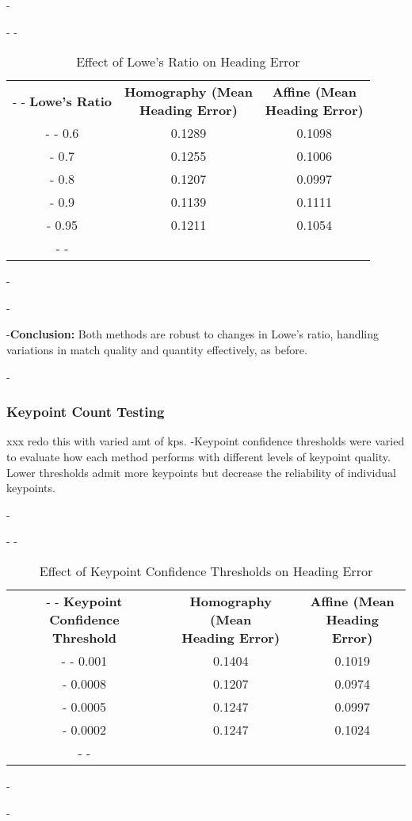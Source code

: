 -\begin{table}[H]
-    \centering
-    \begin{tabular}{|c|c|c|}
-        \hline
-        \textbf{Lowe's Ratio} & \makecell{\textbf{Homography (Mean} \\ \textbf{Heading Error)}} & \makecell{\textbf{Affine (Mean} \\ \textbf{Heading Error)}} \\
-        \hline
-        0.6 & 0.1289 & 0.1098 \\
-        0.7 & 0.1255 & 0.1006 \\
-        0.8 & 0.1207 & 0.0997 \\
-        0.9 & 0.1139 & 0.1111 \\
-        0.95 & 0.1211 & 0.1054 \\
-        \hline
-    \end{tabular}
-    \caption{Effect of Lowe's Ratio on Heading Error}
-\end{table}

-\textbf{Conclusion:} Both methods are robust to changes in Lowe’s ratio, handling variations in match quality and quantity effectively, as before.

-\subsubsection{Keypoint Count Testing} xxx redo this with varied amt of kps.
-Keypoint confidence thresholds were varied to evaluate how each method performs with different levels of keypoint quality. Lower thresholds admit more keypoints but decrease the reliability of individual keypoints.

-\begin{table}[H]
-    \centering
-    \begin{tabular}{|c|c|c|}
-        \hline
-        \makecell{\textbf{Keypoint Confidence} \\ \textbf{Threshold}} & \makecell{\textbf{Homography (Mean} \\ \textbf{Heading Error)}} & \makecell{\textbf{Affine (Mean} \\ \textbf{Heading Error)}}\\
-        \hline
-        0.001 & 0.1404 & 0.1019 \\
-        0.0008 & 0.1207 & 0.0974 \\
-        0.0005 & 0.1247 & 0.0997 \\
-        0.0002 & 0.1247 & 0.1024 \\
-        \hline
-    \end{tabular}
-    \caption{Effect of Keypoint Confidence Thresholds on Heading Error}
-\end{table}


